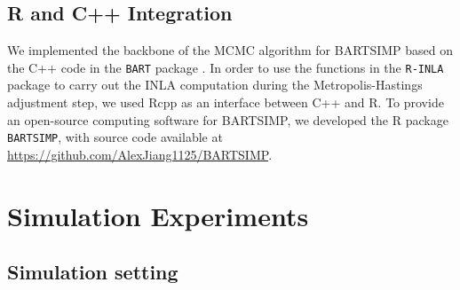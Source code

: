 \documentclass[preprint,12pt,authoryear]{elsarticle}
\begin{document}
{%


\subsection{R and C++ Integration}

We implemented the backbone of the MCMC algorithm for BARTSIMP based on the C++ code in the \texttt{BART} package \citep{spanbauer2021nonparametric}. In order to use the functions in the \texttt{R-INLA} package \citep{martins2013bayesian} to carry out the INLA computation during the Metropolis-Hastings adjustment step, we used Rcpp \citep{eddelbuettel2011rcpp, eddelbuettel2013seamless, eddelbuettel2018extending} as an interface between C++ and R. To provide an open-source computing software for BARTSIMP, we developed the R package \texttt{BARTSIMP}, with source code available at \url{https://github.com/AlexJiang1125/BARTSIMP}. 

\section{Simulation Experiments}
\label{sec:sim}

\subsection{Simulation setting}

}
\end{document}
